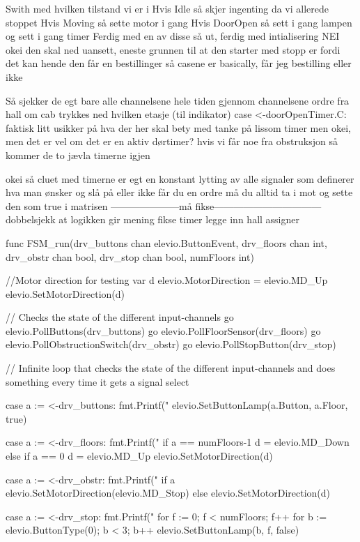 Swith med hvilken tilstand vi er i
    Hvis Idle så skjer ingenting da vi allerede stoppet
    Hvis Moving så sette motor i gang
    Hvis DoorOpen så sett i gang lampen og sett i gang timer
Ferdig med en av disse så ut, ferdig med intialisering
NEI okei den skal ned uansett, eneste grunnen til at den starter med stopp er fordi det kan hende den får en bestillinger
    så casene er basically, får jeg bestilling eller ikke

Så sjekker de egt bare alle channelsene hele tiden gjennom channelsene
    ordre fra hall
    om cab trykkes ned
    hvilken etasje (til indikator)
    case <-doorOpenTimer.C: faktisk litt usikker på hva der her skal bety med tanke på lissom timer men okei, men det er vel om det er en aktiv dørtimer?
    hvis vi får noe fra obstruksjon
    så kommer de to jævla timerne igjen


okei så cluet med timerne er egt en konstant lytting av alle signaler
som definerer hva man ønsker og slå på eller ikke
får du en ordre må du alltid ta i mot og sette den som true i matrisen
---------------------må fikse---------------------------------
dobbelsjekk at logikken gir mening
fikse timer
legge inn hall assigner


func FSM_run(drv_buttons chan elevio.ButtonEvent, drv_floors chan int, drv_obstr chan bool, drv_stop chan bool, numFloors int) {

	//Motor direction for testing
	var d elevio.MotorDirection = elevio.MD_Up
	elevio.SetMotorDirection(d)


	// Checks the state of the different input-channels
	go elevio.PollButtons(drv_buttons)
	go elevio.PollFloorSensor(drv_floors)
	go elevio.PollObstructionSwitch(drv_obstr)
	go elevio.PollStopButton(drv_stop)

	// Infinite loop that checks the state of the different input-channels and does something every time it gets a signal
	select {
	case a := <-drv_buttons:
		fmt.Printf("%
		elevio.SetButtonLamp(a.Button, a.Floor, true)

	case a := <-drv_floors:
		fmt.Printf("%
		if a == numFloors-1 {
			d = elevio.MD_Down
		} else if a == 0 {
			d = elevio.MD_Up
		}
		elevio.SetMotorDirection(d)

	case a := <-drv_obstr:
		fmt.Printf("%
		if a {
			elevio.SetMotorDirection(elevio.MD_Stop)
		} else {
			elevio.SetMotorDirection(d)
		}

	case a := <-drv_stop:
		fmt.Printf("%
		for f := 0; f < numFloors; f++ {
			for b := elevio.ButtonType(0); b < 3; b++ {
				elevio.SetButtonLamp(b, f, false)
			}
		}
	}

}
